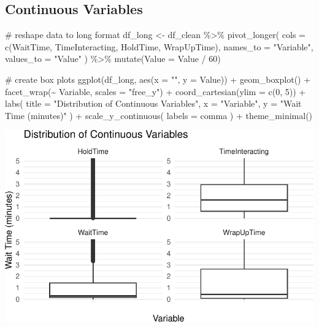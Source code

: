 \documentclass[
  letterpaper,
  DIV=11,
  numbers=noendperiod]{scrartcl}
\newenvironment{Shaded}{\begin{snugshade}}{\end{snugshade}}
\newcommand{\AttributeTok}[1]{\textcolor[rgb]{0.40,0.45,0.13}{#1}}
\newcommand{\CommentTok}[1]{\textcolor[rgb]{0.37,0.37,0.37}{#1}}
\newcommand{\DecValTok}[1]{\textcolor[rgb]{0.68,0.00,0.00}{#1}}
\newcommand{\FunctionTok}[1]{\textcolor[rgb]{0.28,0.35,0.67}{#1}}
\newcommand{\NormalTok}[1]{\textcolor[rgb]{0.00,0.23,0.31}{#1}}
\newcommand{\OtherTok}[1]{\textcolor[rgb]{0.00,0.23,0.31}{#1}}
\newcommand{\SpecialCharTok}[1]{\textcolor[rgb]{0.37,0.37,0.37}{#1}}
\newcommand{\StringTok}[1]{\textcolor[rgb]{0.13,0.47,0.30}{#1}}
\begin{document}
\subsection{Continuous Variables}\label{continuous-variables}

\begin{Shaded}
\begin{Highlighting}[]
\CommentTok{\# reshape data to long format}
\NormalTok{df\_long }\OtherTok{\textless{}{-}}\NormalTok{ df\_clean }\SpecialCharTok{\%\textgreater{}\%}
  \FunctionTok{pivot\_longer}\NormalTok{(}
    \AttributeTok{cols =} \FunctionTok{c}\NormalTok{(WaitTime, TimeInteracting, HoldTime, WrapUpTime), }
    \AttributeTok{names\_to =} \StringTok{"Variable"}\NormalTok{, }\AttributeTok{values\_to =} \StringTok{"Value"}
\NormalTok{  ) }\SpecialCharTok{\%\textgreater{}\%}
  \FunctionTok{mutate}\NormalTok{(}\AttributeTok{Value =}\NormalTok{ Value }\SpecialCharTok{/} \DecValTok{60}\NormalTok{)}

\CommentTok{\# create box plots}
\FunctionTok{ggplot}\NormalTok{(df\_long, }\FunctionTok{aes}\NormalTok{(}\AttributeTok{x =} \StringTok{""}\NormalTok{, }\AttributeTok{y =}\NormalTok{ Value)) }\SpecialCharTok{+} 
  \FunctionTok{geom\_boxplot}\NormalTok{() }\SpecialCharTok{+} 
  \FunctionTok{facet\_wrap}\NormalTok{(}\SpecialCharTok{\textasciitilde{}}\NormalTok{ Variable, }\AttributeTok{scales =} \StringTok{"free\_y"}\NormalTok{) }\SpecialCharTok{+} 
  \FunctionTok{coord\_cartesian}\NormalTok{(}\AttributeTok{ylim =} \FunctionTok{c}\NormalTok{(}\DecValTok{0}\NormalTok{, }\DecValTok{5}\NormalTok{)) }\SpecialCharTok{+}
  \FunctionTok{labs}\NormalTok{(}
    \AttributeTok{title =} \StringTok{"Distribution of Continuous Variables"}\NormalTok{, }
    \AttributeTok{x =} \StringTok{"Variable"}\NormalTok{, }
    \AttributeTok{y =} \StringTok{"Wait Time (minutes)"}
\NormalTok{  ) }\SpecialCharTok{+}
  \FunctionTok{scale\_y\_continuous}\NormalTok{( }\AttributeTok{labels =}\NormalTok{ comma ) }\SpecialCharTok{+}
  \FunctionTok{theme\_minimal}\NormalTok{()}
\end{Highlighting}
\end{Shaded}

\includegraphics{final_proj_group1_files/figure-pdf/boxplot_contvar-1.pdf}
\end{document}
